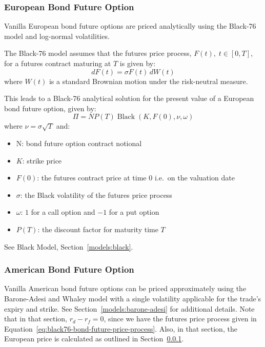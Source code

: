 \subsubsection{European Bond Future Option}
\label{pricing:european-bond-future-option}

Vanilla European bond future options are priced analytically using the Black-76 
model and log-normal volatilities.

The Black-76 model assumes that the futures price process, $F(t),\; t \in [0,T]$, for a 
futures contract maturing at $T$ is given by:
\begin{equation}
dF(t) = \sigma F(t) \, dW(t)
\label{eq:black76-bond-future-price-process}
\end{equation}
where $W(t)$ is a standard Brownian motion under the risk-neutral measure.

This leads to a Black-76 analytical solution for the present value of a European 
bond future option, given by:
\begin{equation*}
\Pi = N P(T) \operatorname{Black}(K, F(0), \nu, \omega)
\end{equation*}
where $\nu = \sigma \sqrt{T}$ and:
\begin{itemize}
\item N: bond future option contract notional
\item $K$: strike price
\item $F(0)$: the futures contract price at time 0 i.e.\ on the valuation date
\item $\sigma$: the Black volatility of the futures price process
\item $\omega$: $1$ for a call option and $-1$ for a put option
\item $P(T)$: the discount factor for maturity time $T$
\end{itemize}

See Black Model, Section~\ref{models:black}.

\subsubsection{American Bond Future Option}
\label{pricing:american-bond-future-option}

Vanilla American bond future options can be priced approximately using the Barone-Adesi 
and Whaley model with a single volatility applicable for the trade's expiry and strike.
See Section~\ref{models:barone-adesi} for additional details. Note that in that section, 
$r_d - r_f = 0$, since we have the futures price process given in 
Equation~\eqref{eq:black76-bond-future-price-process}. Also, in that section, the 
European price is calculated as outlined in Section~\ref{pricing:european-bond-future-option}.

